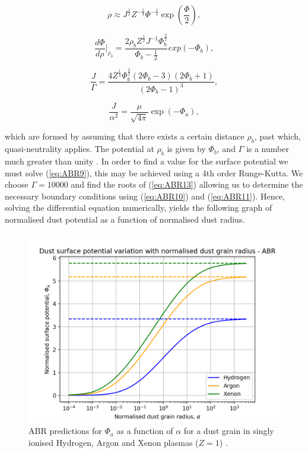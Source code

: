 \documentclass{article}
\begin{document}
\begin{equation}\label{eq:ABR10}
\rho \approx J^{\frac{1}{2}} Z^{-\frac{1}{4}} \Phi^{-\frac{1}{4}} \exp{\left(\frac{\Phi}{2}\right)},
\end{equation}
 
\begin{equation}\label{eq:ABR11}
\frac{d\Phi}{d\rho}\biggr|_{\rho_b} = \frac{2\rho_b Z^{\frac{1}{2}} J^{-1} \Phi_b^{\frac{3}{2}}}{\Phi_b - \frac{1}{2}} exp{(-\Phi_b)},
\end{equation}
 
\begin{equation}\label{eq:ABR13}
\frac{J}{\Gamma} = \frac{4Z^{\frac{1}{2}}\Phi_b^{\frac{3}{2}}(2\Phi_b - 3)(2\Phi_b + 1)}{(2\Phi_b - 1)^3},
\end{equation}

\begin{equation}\label{eq:ABR12}
\frac{J}{\alpha^2} = \frac{\mu}{\sqrt{4\pi}} \exp{\left(-\Phi_a\right)},
\end{equation}

\medskip

\noindent which are formed by assuming that there exists a certain distance $\rho_b$, past which, quasi-neutrality applies. 
The potential at $\rho_b$ is given by $\Phi_b$, and $\Gamma$ is a number much greater than unity \cite{ABR}.
In order to find a value for the surface potential we must solve (\ref{eq:ABR9}), this may be 
achieved using a 4th order Runge-Kutta. We choose $\Gamma = 10000$ and find the roots of 
(\ref{eq:ABR13}) allowing us to determine the necessary boundary conditions 
using (\ref{eq:ABR10}) and (\ref{eq:ABR11}). Hence, solving the differential equation numerically, yields 
the following graph of normalised dust potential as a function of normalised dust radius.

\begin{figure}[H]
\centering
\includegraphics[width=\linewidth]{Output/ABRgraph.jpeg}
\caption{ABR predictions for $\Phi_a$ as a function of $\alpha$ for a dust grain in singly ionised Hydrogen, Argon and Xenon plasmas ($Z=1$) \cite{ABR} \cite{Thomas}.}
\label{ABR} 
\end{figure}
\end{document}
